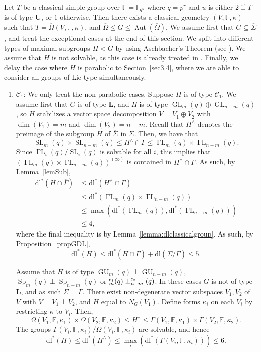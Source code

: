 \documentclass[11pt]{amsart}
\numberwithin{equation}{section}
\theoremstyle{definition}
\theoremstyle{remark}
\newcommand{\Aut}{\mathop{\mathrm{Aut}}}
\DeclareMathOperator{\GL}{GL}
\DeclareMathOperator{\SL}{SL}
\newcommand{\dll}{\mathrm{dl^*}}
\newcommand{\dl}{\mathrm{dl}}
\newcommand{\boldL}{\mathbf{L}}
\DeclareMathOperator{\GammaL}{\Gamma L}
\newcommand{\boldU}{\mathbf{U}}
\DeclareMathOperator{\GU}{GU}
\DeclareMathOperator{\Sp}{Sp}
\let\O\relax
\DeclareMathOperator{\O}{O}
\begin{document}
Let $T$ be a classical simple group over $\mathbb{F} = \mathbb F_{q^u}$ where $q=p^r$ and $u$ is either $2$ if $T$ is of type $\boldU$, or $1$ otherwise.
Then there exists a classical geometry $(V, \mathbb{F}, \kappa)$ such that $T = \overline \Omega(V, \mathbb{F}, \kappa)$, and $\overline \Omega \leqslant G \leqslant \Aut(\overline \Omega)$. We assume first that $G \subseteq \overline \Sigma$, and treat the exceptional cases at the end of this section.
We split into different types of maximal subgroups $H<G$ by using Aschbacher's Theorem (see \cite[Ch.~3]{KL90}).
 We assume that $H$ is not solvable, as this case is already treated in \cite[Th.~1.4]{Sab26}.
Finally, we delay the case where $H$ is parabolic to Section~\ref{sec3.4}, where we are able to consider all groups of Lie type simultaneously.

 \begin{enumerate}
    \item $\mathscr C_1$: We only treat the non-parabolic cases.
    Suppose $H$ is of type $\mathscr C_1$. We assume first that $G$ is of type $\boldL$, and $H$ is of type $\GL_m(q) \oplus \GL_{n-m}(q)$, so $H$ stabilizes a vector space decomposition $V=V_1 \oplus V_2$ with $\dim(V_1) = m$ and $\dim(V_2) = n-m$. Recall that $H^\wedge$ denotes the preimage of the subgroup $H$ of $\overline \Sigma$ in $\Sigma$. Then, we have that
    \[
        \SL_m(q) \times \SL_{n-m}(q) 
        \leqslant H^\wedge \cap \Gamma \leqslant
        \GammaL_m(q) \times \GammaL_{n-m}(q).
    \]
    Since $\GammaL_i(q)/\SL_i(q)$ is solvable for all $i$, this implies that $(\GammaL_m(q) \times \GammaL_{n-m}(q))^{(\infty)}$ is contained in $H^\wedge \cap \Gamma$. As such, by Lemma~\ref{lemSub},
    \begin{align*}
        \dll(H \cap \overline \Gamma) & \leq \dll(H^\wedge \cap \Gamma)\\
        & \leq \dll(\GammaL_m(q) \times \GammaL_{n-m}(q))\\
        & \leq \max(\dll(\GammaL_m(q)), \dll(\GammaL_{n-m}(q))) \\
        & \leq 4,
    \end{align*}
    where the final inequality is by Lemma~\ref{lemma:dlclassicalgroup}. As such, by Proposition~\ref{propGDL},
    \[
        \dll(H) \leq \dll(H \cap \overline \Gamma) + \dl(\overline \Sigma/\overline \Gamma) \leq 5.
    \]
    
    Assume that $H$ is of type $\GU_m(q) \perp \GU_{n-m}(q)$, $\Sp_m(q) \perp \Sp_{n-m}(q)$ or $\O_m^{\epsilon_1}(q) \perp \O_{n-m}^{\epsilon_2}(q)$. In these cases $G$ is not of type $\boldL$, and as such $\Sigma = \Gamma$. There exist non-degenerate vector subspaces $V_1, V_2$ of $V$ with $V = V_1 \perp V_2$, and $H$ equal to $N_G(V_1)$. Define forms $\kappa_i$ on each $V_i$ by restricting $\kappa$ to $V_i$. Then,
    \[
        \Omega(V_1, \mathbb F, \kappa_1) \times \Omega(V_2, \mathbb F, \kappa_2)
        \leqslant H^{\wedge} \leqslant
        \Gamma(V_1, \mathbb F, \kappa_1) \times \Gamma(V_2, \mathbb F, \kappa_2).
    \]
    The groups $\Gamma(V_i, \mathbb F, \kappa_i)/\Omega(V_i, \mathbb F, \kappa_i)$ are solvable, and hence
    \[
        \dll(H) \leq \dll(H^\wedge) \leq \max_i \left( \dll(\Gamma(V_i, \mathbb F, \kappa_i))\right) \leq 6.
    \]
    

\end{enumerate}
\end{document}

